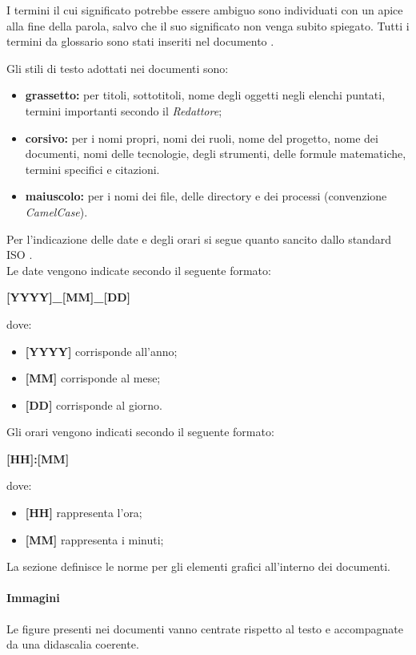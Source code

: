 I termini il cui significato potrebbe essere ambiguo sono individuati con un apice  alla fine della parola, salvo che il suo significato non venga subito spiegato. Tutti i termini da glossario sono stati inseriti nel documento \Glossariov.

Gli stili di testo adottati nei documenti sono:
\begin{itemize}
	\item \textbf{grassetto:} per titoli, sottotitoli, nome degli oggetti negli elenchi puntati, termini importanti secondo il \textit{Redattore};
	\item \textbf{corsivo:} per i nomi propri, nomi dei ruoli, nome del progetto, nome dei documenti, nomi delle tecnologie, degli strumenti, delle formule matematiche, termini specifici e citazioni.
	\item \textbf{maiuscolo:} per i nomi dei file, delle directory e dei processi (convenzione \textit{CamelCase}).	
\end{itemize}

Per l'indicazione delle date e degli orari si segue quanto sancito dallo standard ISO . \\
Le date vengono indicate secondo il seguente formato:
\begin{center}
	\textbf{[YYYY]\_[MM]\_[DD]} 
\end{center}
dove:
\begin{itemize}
	\item \textbf{[YYYY]} corrisponde all'anno;
	\item \textbf{[MM]} corrisponde al mese;
	\item \textbf{[DD]} corrisponde al giorno.
\end{itemize}

Gli orari vengono indicati secondo il seguente formato:
\begin{center}
	\textbf{[HH]:[MM]} 
\end{center}
dove:
\begin{itemize}
	\item \textbf{[HH]} rappresenta l'ora;
	\item \textbf{[MM]} rappresenta i minuti;
\end{itemize}

La sezione definisce le norme per gli elementi grafici all'interno dei documenti.
\paragraph*{Immagini}
Le figure presenti nei documenti vanno centrate rispetto al testo e accompagnate da una didascalia coerente.
